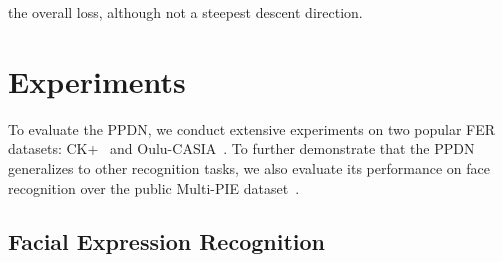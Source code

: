\documentclass[runningheads]{llncs}
\begin{document}
the overall loss, although not a steepest descent direction.
\section{Experiments}

To evaluate the PPDN, we conduct extensive experiments on two popular 
FER datasets: CK+~\cite{lucey2010extended} and 
Oulu-CASIA~\cite{zhao2011facial}. To further demonstrate that the PPDN
generalizes to other recognition tasks, we also evaluate its performance
on face recognition over the public Multi-PIE 
dataset~\cite{gross2010multi}.

\subsection{Facial Expression Recognition}
\end{document}

